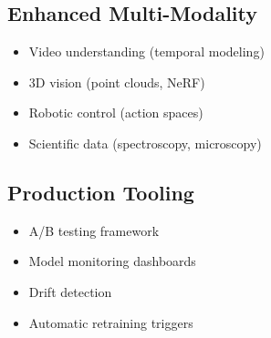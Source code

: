 \subsection{Enhanced Multi-Modality}

\begin{itemize}
\item Video understanding (temporal modeling)
\item 3D vision (point clouds, NeRF)
\item Robotic control (action spaces)
\item Scientific data (spectroscopy, microscopy)
\end{itemize}

\subsection{Production Tooling}

\begin{itemize}
\item A/B testing framework
\item Model monitoring dashboards
\item Drift detection
\item Automatic retraining triggers
\end{itemize}

